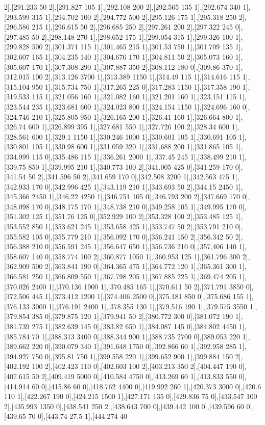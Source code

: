 {2],[291.233 50 2],[291.827 105 1],[292.108 200 2],[292.565 135 1],[292.674 340 1],[293.599 315 1],[294.702 100 2],[294.772 500 2],[295.126 175 1],[295.318 250 2],[296.586 215 1],[296.615 50 2],[296.685 250 2],[297.261 200 2],[297.322 245 0],[297.485 50 2],[298.148 270 1],[298.652 175 1],[299.054 315 1],[299.326 100 1],[299.828 500 2],[301.371 115 1],[301.465 215 1],[301.53 750 1],[301.709 135 1],[302.607 165 1],[304.235 140 1],[304.676 170 1],[304.811 50 2],[305.073 160 1],[305.607 170 1],[307.308 290 1],[307.887 350 2],[308.112 180 0],[309.86 370 1],[312.015 100 2],[313.126 3700 1],[313.389 1150 1],[314.49 115 1],[314.616 115 1],[315.104 950 1],[315.734 750 1],[317.265 225 0],[317.283 1150 1],[317.358 190 1],[319.533 115 1],[321.056 160 1],[321.082 160 1],[321.201 160 1],[323.151 115 1],[323.544 235 1],[323.681 600 1],[324.023 800 1],[324.154 1150 1],[324.696 160 0],[324.746 210 1],[325.805 950 1],[326.165 200 1],[326.41 160 1],[326.664 800 1],[326.74 600 1],[326.899 395 1],[327.681 550 1],[327.726 100 2],[328.34 600 1],[328.561 600 1],[329.1 1150 1],[330.246 1000 1],[330.601 105 1],[330.691 105 1],[330.801 105 1],[330.98 600 1],[331.059 320 1],[331.688 200 1],[331.865 105 1],[334.999 115 0],[335.486 115 1],[336.261 2000 1],[337.45 245 1],[338.499 210 1],[339.75 850 1],[339.995 210 1],[340.773 100 2],[341.005 425 0],[341.259 170 0],[341.54 50 2],[341.596 50 2],[341.659 170 0],[342.508 3200 1],[342.563 475 1],[342.933 170 0],[342.996 425 1],[343.119 210 1],[343.693 50 2],[344.15 2450 1],[345.366 2450 1],[346.22 4250 1],[346.751 105 0],[346.793 200 2],[347.669 170 0],[348.098 170 0],[348.175 170 1],[348.738 210 0],[349.258 105 1],[349.995 170 0],[351.302 125 1],[351.76 125 0],[352.929 100 2],[353.328 100 2],[353.485 125 1],[353.552 850 1],[353.621 245 1],[353.658 425 1],[353.747 50 2],[353.791 210 0],[355.582 105 0],[355.779 210 1],[356.092 170 0],[356.241 150 2],[356.342 50 2],[356.388 210 0],[356.591 245 1],[356.647 650 1],[356.736 210 0],[357.406 140 1],[358.607 140 0],[358.774 100 2],[360.877 1050 1],[360.953 125 1],[361.796 300 2],[362.909 500 2],[363.841 190 0],[364.365 475 1],[364.772 120 1],[365.361 300 1],[366.581 250 1],[366.809 550 1],[367.798 205 1],[367.885 225 1],[369.474 205 1],[370.026 2400 1],[370.136 1900 1],[370.485 165 1],[370.611 50 2],[371.791 3850 0],[372.506 445 1],[373.412 1200 1],[374.406 2500 0],[375.181 850 0],[375.686 155 1],[376.133 3000 1],[376.191 2400 1],[378.355 130 1],[379.516 190 1],[379.575 3550 1],[379.854 385 0],[379.875 120 1],[379.941 50 2],[380.772 300 0],[381.072 190 1],[381.739 275 1],[382.639 145 0],[383.82 650 1],[384.087 145 0],[384.802 4450 1],[385.784 70 1],[388.313 3400 0],[388.344 900 1],[388.735 2700 0],[389.053 220 1],[389.662 220 0],[390.079 340 1],[391.648 1750 0],[392.866 60 1],[392.958 285 1],[394.927 750 0],[395.81 750 1],[399.558 220 1],[399.652 900 1],[399.884 150 2],[402.192 100 2],[402.423 110 0],[402.603 100 2],[403.213 350 2],[404.447 190 0],[407.615 50 2],[409.419 5000 0],[410.584 4750 0],[413.269 60 1],[413.833 550 0],[414.914 60 0],[415.86 60 0],[418.762 4400 0],[419.992 260 1],[420.373 3000 0],[420.6 110 1],[422.267 190 0],[424.215 1500 1],[427.171 135 0],[429.836 75 0],[433.547 100 2],[435.993 1350 0],[438.541 250 2],[438.643 700 0],[439.442 100 0],[439.596 60 0],[439.65 70 0],[443.74 27.5 1],[444.274 40 }

